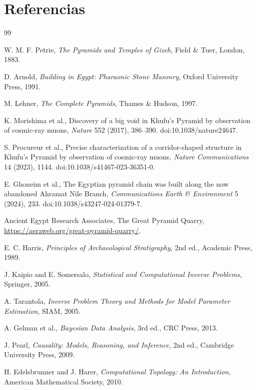 
\section{Referencias}

\begin{thebibliography}{99}

W. M. F. Petrie,
\emph{The Pyramids and Temples of Gizeh},
Field \& Tuer, London, 1883.

D. Arnold,
\emph{Building in Egypt: Pharaonic Stone Masonry},
Oxford University Press, 1991.

M. Lehner,
\emph{The Complete Pyramids},
Thames \& Hudson, 1997.

K. Morishima et al.,
Discovery of a big void in Khufu's Pyramid by observation of cosmic-ray muons,
\emph{Nature} 552 (2017), 386--390.
doi:10.1038/nature24647.

S. Procureur et al.,
Precise characterization of a corridor-shaped structure in Khufu's Pyramid by observation of cosmic-ray muons,
\emph{Nature Communications} 14 (2023), 1144.
doi:10.1038/s41467-023-36351-0.

E. Ghoneim et al.,
The Egyptian pyramid chain was built along the now abandoned Ahramat Nile Branch,
\emph{Communications Earth \& Environment} 5 (2024), 233.
doi:10.1038/s43247-024-01379-7.

Ancient Egypt Research Associates,
The Great Pyramid Quarry,
\url{https://aeraweb.org/great-pyramid-quarry/}.

E. C. Harris,
\emph{Principles of Archaeological Stratigraphy},
2nd ed., Academic Press, 1989.

J. Kaipio and E. Somersalo,
\emph{Statistical and Computational Inverse Problems},
Springer, 2005.

A. Tarantola,
\emph{Inverse Problem Theory and Methods for Model Parameter Estimation},
SIAM, 2005.

A. Gelman et al.,
\emph{Bayesian Data Analysis},
3rd ed., CRC Press, 2013.

J. Pearl,
\emph{Causality: Models, Reasoning, and Inference},
2nd ed., Cambridge University Press, 2009.

H. Edelsbrunner and J. Harer,
\emph{Computational Topology: An Introduction},
American Mathematical Society, 2010.


\end{thebibliography}
